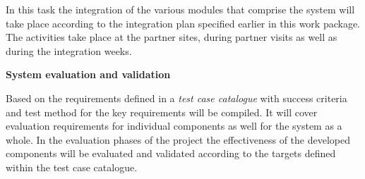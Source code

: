 {\begin{tasks}{\WPIntegrationNo}
In this task the integration of the various modules that comprise the \Project{} system will take place according to the integration plan specified earlier in this work package. The activities take place at the partner sites, during partner visits as well as during the integration weeks.

%

\item {\bf System evaluation and validation}
\label{task:wpint:eval}

Based on the requirements defined in \WPSpecification a \emph{test case catalogue} with success criteria and test method for the key requirements will be compiled. It will cover evaluation requirements for individual components as well for the system as a whole.
In the evaluation phases of the project the effectiveness of the developed components will be evaluated and validated according to the targets defined within the test case catalogue.

\end{tasks}

\begin{deliverables}{\WPIntegrationNo}



\end{deliverables}}
